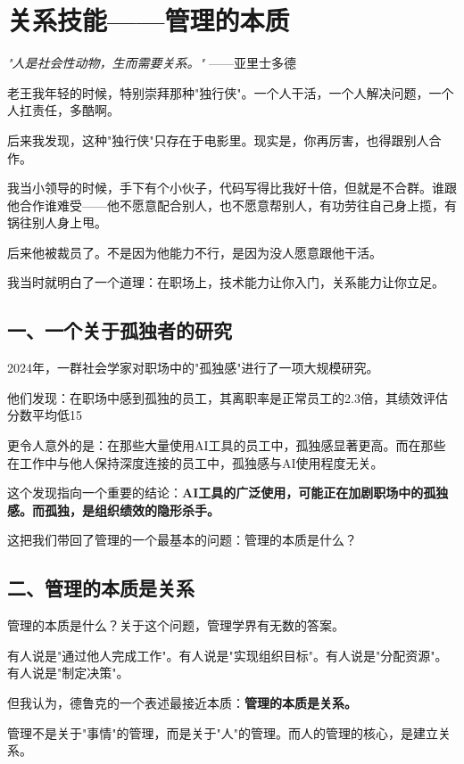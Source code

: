 \chapter{关系技能——管理的本质}


\textit{"人是社会性动物，生而需要关系。"}
——亚里士多德


老王我年轻的时候，特别崇拜那种"独行侠"。一个人干活，一个人解决问题，一个人扛责任，多酷啊。

后来我发现，这种"独行侠"只存在于电影里。现实是，你再厉害，也得跟别人合作。

我当小领导的时候，手下有个小伙子，代码写得比我好十倍，但就是不合群。谁跟他合作谁难受——他不愿意配合别人，也不愿意帮别人，有功劳往自己身上揽，有锅往别人身上甩。

后来他被裁员了。不是因为他能力不行，是因为没人愿意跟他干活。

我当时就明白了一个道理：在职场上，技术能力让你入门，关系能力让你立足。

\section{一、一个关于孤独者的研究}


2024年，一群社会学家对职场中的"孤独感"进行了一项大规模研究。

他们发现：在职场中感到孤独的员工，其离职率是正常员工的2.3倍，其绩效评估分数平均低15%

更令人意外的是：在那些大量使用AI工具的员工中，孤独感显著更高。而在那些在工作中与他人保持深度连接的员工中，孤独感与AI使用程度无关。

这个发现指向一个重要的结论：\textbf{AI工具的广泛使用，可能正在加剧职场中的孤独感。而孤独，是组织绩效的隐形杀手。}

这把我们带回了管理的一个最基本的问题：管理的本质是什么？

\section{二、管理的本质是关系}


管理的本质是什么？关于这个问题，管理学界有无数的答案。

有人说是"通过他人完成工作"。有人说是"实现组织目标"。有人说是"分配资源"。有人说是"制定决策"。

但我认为，德鲁克的一个表述最接近本质：\textbf{管理的本质是关系。}

管理不是关于"事情"的管理，而是关于"人"的管理。而人的管理的核心，是建立关系。

